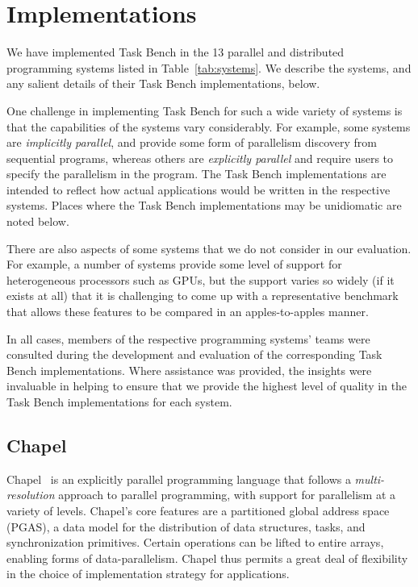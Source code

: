 \section{Implementations}
\label{sec:implementation}



We have implemented Task Bench in the 13 parallel and distributed
programming systems listed in Table~\ref{tab:systems}. We describe the
systems, and any salient details of their Task Bench implementations,
below.

One challenge in implementing Task Bench for such a wide variety of
systems is that the capabilities of the systems vary considerably. For
example, some systems are \emph{implicitly parallel}, and provide some
form of parallelism discovery from sequential programs, whereas others
are \emph{explicitly parallel} and require users to specify the
parallelism in the program. The Task
Bench implementations are intended to reflect how actual applications
would be written in the respective systems. Places where the Task
Bench implementations may be unidiomatic are noted below.

There are also aspects of some systems that we do not consider in our
evaluation. For example, a number of systems provide some level of
support for heterogeneous processors such as GPUs, but the support
varies so widely (if it exists at all) that it is challenging to come
up with a representative benchmark that allows these features to be
compared in an apples-to-apples manner.

In all cases, members of the respective programming systems' teams
were consulted during the development and evaluation of the
corresponding Task Bench implementations. Where assistance was provided, the insights were invaluable
in helping to ensure that we provide the highest level of quality in the Task
Bench implementations for each system.

\subsection{Chapel}

Chapel~\cite{Chapel07} is an explicitly parallel programming language
that follows a \emph{multi-resolution} approach to parallel
programming, with support for parallelism at a variety of
levels. Chapel's core features are a partitioned global address space
(PGAS), a data model for the distribution of data structures, tasks, and
synchronization primitives. Certain operations can be lifted to entire arrays, enabling forms of data-parallelism. Chapel thus permits a great deal of
flexibility in the choice of implementation strategy for applications.

